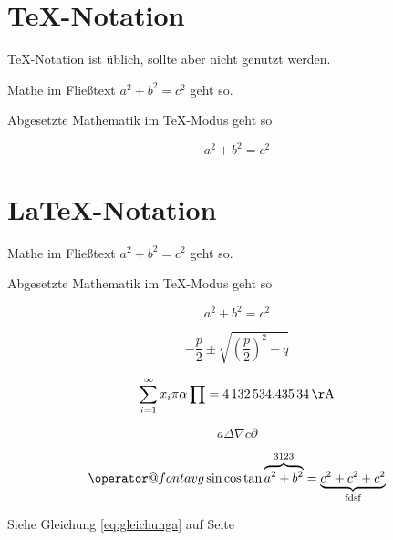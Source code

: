 \documentclass[12pt,ngerman,parskip=half]{scrartcl}
\makeatletter
\newcommand{\avg}{\mathop{\operator@font avg}}
\makeatother
\begin{document}
\blindtext

\section{TeX-Notation}

TeX-Notation ist üblich, sollte aber nicht genutzt werden.

Mathe im Fließtext $a^2+b^2=c^2$ geht so.

Abgesetzte Mathematik im TeX-Modus geht so 

$$a^2+b^2=c^2$$ 

\section{LaTeX-Notation}

Mathe im Fließtext \(a^2+b^2=c^2\) geht so.

Abgesetzte Mathematik im TeX-Modus geht so 

\[a^2+b^2=c^2\] 

\begin{equation}
- \frac{p}{2} \pm \sqrt{\left(\frac{p}{2}\right)^2 - q}
\end{equation}

\begin{equation}\label{eq:gleichunga}
\sum_{i=1}^\infty x_i \pi \alpha \prod = \qty{4132534.43534}{\AA}
\end{equation}



\begin{equation}
a \Delta \nabla c  \partial 
\end{equation}

\begin{equation}
\avg \sin \cos \tan \overbrace{a^2 + b^2}^{3123} = \underbrace{c^2 + c^2 + c^2}_{\text{fdsf}}
\end{equation}



Siehe Gleichung \ref{eq:gleichunga} auf Seite \pageref{eq:gleichunga}
\end{document}
